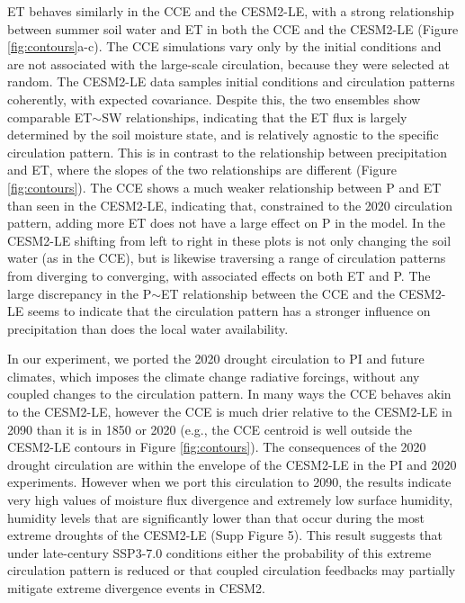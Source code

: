 \documentclass[draft]{agujournal2019}
\begin{document}
ET behaves similarly in the CCE and the CESM2-LE, with a strong relationship between summer soil water and ET in both the CCE and the CESM2-LE (Figure \ref{fig:contours}a-c).
The CCE simulations vary only by the initial conditions and are not associated with the large-scale circulation, because they were selected at random.
The CESM2-LE data samples initial conditions and circulation patterns coherently, with expected covariance. 
Despite this, the two ensembles show comparable ET$\sim$SW relationships, indicating that the ET flux is largely determined by the soil moisture state, and is relatively agnostic to the specific circulation pattern.
This is in contrast to the relationship between precipitation and ET, where the slopes of the two relationships are different (Figure \ref{fig:contours}).
The CCE shows a much weaker relationship between P and ET than seen in the CESM2-LE, indicating that, constrained to the 2020 circulation pattern, adding more ET does not have a large effect on P in the model.
In the CESM2-LE shifting from left to right in these plots is not only changing the soil water (as in the CCE), but is likewise traversing a range of circulation patterns from diverging to converging, with associated effects on both ET and P. 
The large discrepancy in the P$\sim$ET relationship between the CCE and the CESM2-LE seems to indicate that the circulation pattern has a stronger influence on precipitation than does the local water availability.

In our experiment, we ported the 2020 drought circulation to PI and future climates, which imposes the climate change radiative forcings, without any coupled changes to the circulation pattern.
In many ways the CCE behaves akin to the CESM2-LE, however the CCE is much drier relative to the CESM2-LE in 2090 than it is in 1850 or 2020 (e.g., the CCE centroid is well outside the CESM2-LE contours in Figure \ref{fig:contours}). 
The consequences of the 2020 drought circulation are within the envelope of the CESM2-LE in the PI and 2020 experiments.
However when we port this circulation to 2090, the results indicate very high values of moisture flux divergence and extremely low surface humidity, humidity levels that are significantly lower than that occur during the most extreme droughts of the CESM2-LE (Supp Figure 5).
This result suggests that under late-century SSP3-7.0 conditions either the probability of this extreme circulation pattern is reduced or that coupled circulation feedbacks may partially mitigate extreme divergence events in CESM2.
\end{document}
